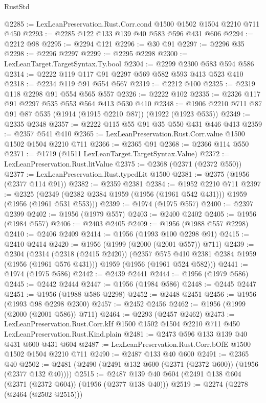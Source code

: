 \begin{lexlean}{RustStd}
\begin{coremodule}
@2285 := LexLeanPreservation.Rust.Corr.cond @1500 @1502 @1504 @2210 @711 @450
@2293 := @2285 @122 @133 @139 @40 @583 @596 @431 @606
@2294 := @2212 @98
@2295 := @2294 @121
@2296 := @30 @91
@2297 := @2296 @35
@2298 := @2296 @2297
@2299 := @2295 @2298
@2300 := LexLeanTarget.TargetSyntax.Ty.bool
@2304 := @2299 @2300 @583 @594 @586
@2314 := @2222 @119 @117 @91 @2297 @569 @582 @593 @413 @523 @410
@2318 := @2234 @119 @91 @554 @567
@2319 := @2212 @100
@2325 := @2319 @118 @2298 @91 @554 @565 @557
@2326 := @2222 @102
@2335 := @2326 @117 @91 @2297 @535 @553 @564 @413 @530 @410
@2348 := @1906 @2210 @711 @87 @91 @87 @535 (@1914 (@1915 @2210 @87)) (@1922 (@1923 @535))
@2349 := @2335 @2348
@2357 := @2222 @115 @55 @91 @35 @550 @431 @446 @413
@2359 := @2357 @541 @410
@2365 := LexLeanPreservation.Rust.Corr.value @1500 @1502 @1504 @2210 @711
@2366 := @2365 @91
@2368 := @2366 @114 @550
@2371 := @1719 (@1511 LexLeanTarget.TargetSyntax.Value)
@2372 := LexLeanPreservation.Rust.litValue
@2375 := @2368 (@2371 (@2372 @550))
@2377 := LexLeanPreservation.Rust.typedLit @1500
@2381 := @2375 (@1956 (@2377 @114 @91))
@2382 := @2359 @2381
@2384 := @1952 @2210 @711
@2397 := @2325 (@2349 (@2382 @2384 @1959 (@1956 (@1961 @542 @431))) @1959 (@1956 (@1961 @531 @553)))
@2399 := @1974 (@1975 @557)
@2400 := @2397 @2399
@2402 := @1956 (@1979 @557)
@2403 := @2400 @2402
@2405 := @1956 (@1984 @557)
@2406 := @2403 @2405
@2409 := @1956 (@1988 @557 @2298)
@2410 := @2406 @2409
@2414 := @1956 (@1993 @100 @2298 @91)
@2415 := @2410 @2414
@2420 := @1956 (@1999 (@2000 (@2001 @557)) @711)
@2439 := @2304
    (@2314
      (@2318 (@2415 @2420))
      (@2357 @575 @410 @2381 @2384 @1959 (@1956 (@1961 @576 @431)))
      @1959
      (@1956 (@1961 @524 @582)))
@2441 := @1974 (@1975 @586)
@2442 := @2439 @2441
@2444 := @1956 (@1979 @586)
@2445 := @2442 @2444
@2447 := @1956 (@1984 @586)
@2448 := @2445 @2447
@2451 := @1956 (@1988 @586 @2298)
@2452 := @2448 @2451
@2456 := @1956 (@1993 @98 @2298 @2300)
@2457 := @2452 @2456
@2462 := @1956 (@1999 (@2000 (@2001 @586)) @711)
@2464 := @2293 (@2457 @2462)
@2473 := LexLeanPreservation.Rust.Corr.kIf
    @1500
    @1502
    @1504
    @2210
    @711
    @450
    LexLeanPreservation.Rust.Kind.plain
@2481 := @2473 @596 @133 @139 @40 @431 @600 @431 @604
@2487 := LexLeanPreservation.Rust.Corr.bOfE @1500 @1502 @1504 @2210 @711
@2490 := @2487 @133 @40 @600
@2491 := @2365 @40
@2502 := @2481 (@2490 (@2491 @132 @600 (@2371 (@2372 @600)) (@1956 (@2377 @132 @40))))
@2515 := @2487 @139 @40 @604 (@2491 @138 @604 (@2371 (@2372 @604)) (@1956 (@2377 @138 @40)))
@2519 := @2274 (@2278 (@2464 (@2502 @2515)))

\end{coremodule}
\end{lexlean}
